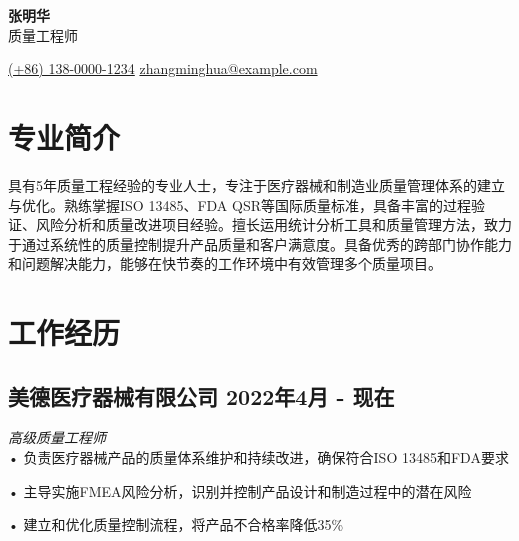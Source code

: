 \documentclass[a4paper,10pt]{article}
\begin{document}
\pagestyle{empty}

\begin{center}
    \textbf{\Huge 张明华} \\
    \vspace{2mm}
     质量工程师
\end{center}

\vspace{4mm}
\begin{center}
     \href{https://wa.me/1234567890}{(+86) 138-0000-1234} \hspace{2cm}
     \href{mailto:zhangminghua@example.com}{zhangminghua@example.com} \hspace{2cm}
\end{center}

\space
\section*{ 专业简介}

具有5年质量工程经验的专业人士，专注于医疗器械和制造业质量管理体系的建立与优化。熟练掌握ISO 13485、FDA QSR等国际质量标准，具备丰富的过程验证、风险分析和质量改进项目经验。擅长运用统计分析工具和质量管理方法，致力于通过系统性的质量控制提升产品质量和客户满意度。具备优秀的跨部门协作能力和问题解决能力，能够在快节奏的工作环境中有效管理多个质量项目。

\section*{ 工作经历}

\subsection*{美德医疗器械有限公司 \hfill 2022年4月 - 现在}
\textit{ 高级质量工程师} \\
• 负责医疗器械产品的质量体系维护和持续改进，确保符合ISO 13485和FDA要求

• 主导实施FMEA风险分析，识别并控制产品设计和制造过程中的潜在风险

• 建立和优化质量控制流程，将产品不合格率降低35\%
\end{document}
